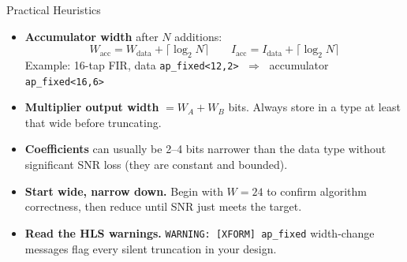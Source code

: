 \documentclass[aspectratio=169,12pt]{beamer}
\begin{document}
\begin{frame}[t]{Practical Heuristics}
\vspace{0.04cm}
\begin{itemize}\setlength{\itemsep}{4pt}
  \item[\color{Orange}$\blacktriangleright$]
    \textbf{Accumulator width} after $N$ additions:
    \[
      W_{\text{acc}} = W_{\text{data}} + \lceil \log_2 N \rceil
      \qquad
      I_{\text{acc}} = I_{\text{data}} + \lceil \log_2 N \rceil
    \]
    {\small Example: 16-tap FIR, data \texttt{ap\_fixed<12,2>}
      $\;\Rightarrow\;$ accumulator \texttt{ap\_fixed<16,6>}}
  \item[\color{Teal}$\blacktriangleright$]
    \textbf{Multiplier output width} $= W_A + W_B$ bits.
    Always store in a type at least that wide before truncating.
  \item[\color{Navy}$\blacktriangleright$]
    \textbf{Coefficients} can usually be 2--4 bits narrower than the data type
    without significant SNR loss (they are constant and bounded).
  \item[\color{GreenHi}$\blacktriangleright$]
    \textbf{Start wide, narrow down.}
    Begin with $W = 24$ to confirm algorithm correctness,
    then reduce until SNR just meets the target.
  \item[\color{BoxGray}$\blacktriangleright$]
    \textbf{Read the HLS warnings.}
    \texttt{WARNING: [XFORM] ap\_fixed} width-change messages flag every
    silent truncation in your design.
\end{itemize}
\end{frame}
\end{document}
